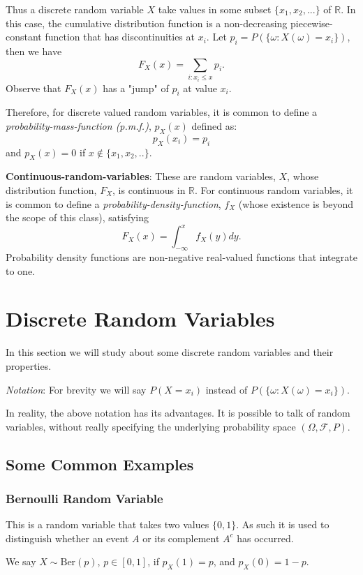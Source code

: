 Thus a discrete random variable $X$ take values in some subset $\{x_1, x_2, ...\}$ of $\mathbb{R}$. In this case, the cumulative distribution function is a non-decreasing piecewise-constant function that has discontinuities at $x_i$. Let $p_i = P(\{\omega:X(\omega)=x_i\})$, then we have
$$ F_X(x) = \sum_{i:x_i \leq x} p_i.$$
Observe that $F_X(x)$ has a "jump" of $p_i$ at value $x_i$.

Therefore, for discrete valued random variables, it is common to define a \textit{probability-mass-function (p.m.f.)}, $p_X(x)$ defined as:
$$ p_X(x_i) = p_i$$
and $p_X(x)=0 $ if $x \notin \{x_1,x_2,..\}.$


\textbf{Continuous-random-variables}: These are random variables, $X$, whose distribution function, $F_X$, is continuous in $\mathbb{R}$. For continuous random variables, it is common to define a \textit{probability-density-function}, $f_X$ (whose existence is beyond the scope of this class), satisfying
$$  F_X(x) = \int_{-\infty}^x f_X(y) dy.$$
Probability density functions are non-negative real-valued functions that integrate to one.

\section{Discrete Random Variables}
In this section we will study about some discrete random variables and their properties.

\textit{Notation}: For brevity we will say $P(X=x_i)$ instead of $P(\{\omega: X(\omega)=x_i\})$.

\begin{remark}
In reality, the above notation has its advantages. It is possible to talk of random variables, without really specifying the underlying probability space $(\Omega,\mathcal{F},P)$.
\end{remark}

\subsection{Some Common Examples}

\subsubsection{Bernoulli Random Variable} This is a random variable that takes two values $\{0,1\}$. As such it is used to distinguish whether an event $A$ or its complement $A^c$ has occurred.

We say $X \sim \textrm{Ber}(p)$, $p \in [0,1]$, if $p_X(1)=p$, and $p_X(0)=1-p.$

